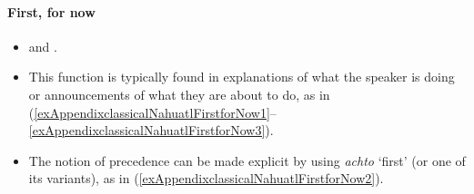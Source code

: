 \paragraph{First, for now}\label{appendixClassicalNahuatlFirst}
\begin{itemize}
	\item \textcite[502]{Carochi1645} and \textcite[1264]{Launey1986}.
	\item This function is typically found in explanations of what the speaker is doing or announcements of what they are about to do, as in (\ref{exAppendixclassicalNahuatlFirstforNow1}–\ref{exAppendixclassicalNahuatlFirstforNow3}).

	\item The notion of precedence can be made explicit by using \textit{achto} \lq first' (or one of its variants), as in (\ref{exAppendixclassicalNahuatlFirstforNow2}).
\end{itemize}
